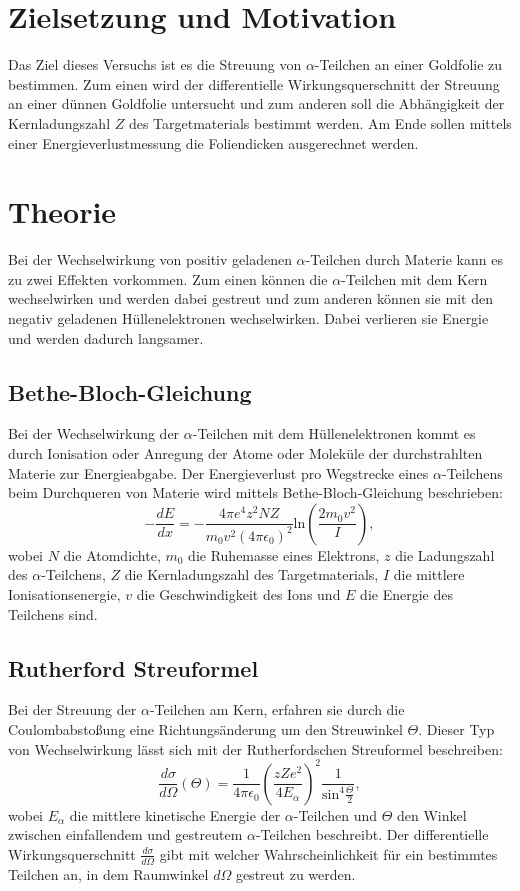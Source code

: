 \section{Zielsetzung und Motivation}
\label{sec:ZielsetzungundMotivation}
Das Ziel dieses Versuchs ist es die Streuung von $\alpha$-Teilchen an einer Goldfolie zu bestimmen. Zum einen wird der differentielle Wirkungsquerschnitt der Streuung an einer dünnen Goldfolie untersucht und zum anderen soll die Abhängigkeit der Kernladungszahl $Z$ des Targetmaterials bestimmt werden.
Am Ende sollen mittels einer Energieverlustmessung die Foliendicken ausgerechnet werden.

\section{Theorie}
\label{sec:Theorie}
Bei der Wechselwirkung von positiv geladenen $\alpha$-Teilchen durch Materie kann es zu zwei Effekten vorkommen. Zum einen können die $\alpha$-Teilchen mit dem Kern wechselwirken und werden dabei gestreut und zum anderen können sie mit den negativ geladenen Hüllenelektronen wechselwirken. Dabei verlieren sie Energie und werden dadurch langsamer. 

\subsection{Bethe-Bloch-Gleichung}
Bei der Wechselwirkung der $\alpha$-Teilchen mit dem Hüllenelektronen kommt es durch Ionisation oder Anregung der Atome oder Moleküle der durchstrahlten Materie zur Energieabgabe. Der Energieverlust pro Wegstrecke eines $\alpha$-Teilchens beim Durchqueren von Materie wird mittels Bethe-Bloch-Gleichung beschrieben:
\begin{equation}
-\frac{dE}{dx} = - \frac{4 \pi e^4 z^2 N Z}{m_0 v^2 (4\pi\epsilon_0)^2}\text{ln}\left(\frac{2 m_0 v^2}{I}\right),
\end{equation}
wobei $N$ die Atomdichte, $m_0$ die Ruhemasse eines Elektrons, $z$ die Ladungszahl des $\alpha$-Teilchens, $Z$ die Kernladungszahl des Targetmaterials, $I$ die mittlere Ionisationsenergie, $v$ die Geschwindigkeit des Ions und $E$ die Energie des Teilchens sind.

\subsection{Rutherford Streuformel}
Bei der Streuung der $\alpha$-Teilchen am Kern, erfahren sie durch die Coulombabstoßung eine Richtungsänderung um den Streuwinkel $\Theta$. Dieser Typ von Wechselwirkung lässt sich mit der Rutherfordschen Streuformel beschreiben:
\begin{equation}
\frac{d\sigma}{d\Omega}(\Theta) = \frac{1}{4 \pi \epsilon_0} \left(\frac{z Z e^2}{4 E_\alpha}\right)^2 \frac{1}{\text{sin}^4 \frac{\Theta}{2}},
\end{equation}
wobei $E_\alpha$ die mittlere kinetische Energie der $\alpha$-Teilchen und $\Theta$ den Winkel zwischen einfallendem und gestreutem $\alpha$-Teilchen beschreibt. Der differentielle Wirkungsquerschnitt $\frac{d\sigma}{d\Omega}$ gibt mit welcher Wahrscheinlichkeit für ein bestimmtes Teilchen an, in dem Raumwinkel $d\Omega$ gestreut zu werden.
